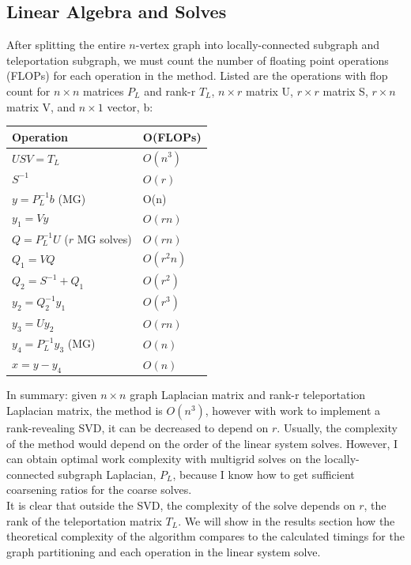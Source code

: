 \documentclass{article}
\begin{document}
\subsection{Linear Algebra and Solves}
After splitting the entire $n$-vertex graph into locally-connected subgraph and teleportation subgraph, we must count the number of floating point operations (FLOPs) for each operation in the method. Listed are the operations with flop count for $n\times n$ matrices $P_L$ and rank-r $T_L$, $n\times r$ matrix U, $r\times r$ matrix S, $r\times n$ matrix V, and $n\times 1$ vector, b:\\
\begin{spacing}{1}
\begin{center}
\renewcommand{\arraystretch}{1.5}
    \begin{tabular}{ | l | l |}
    \hline
    \textbf{Operation} & \textbf{O(FLOPs)} \\ \hline
    $USV = T_L$ & $O(n^3)$ \\ \hline
    $S^{-1}$ & $O(r)$ \\ \hline
    $y = P_L^{-1}b$ (MG) & O(n)  \\  \hline
    $y_1 = Vy$ & $O(rn)$ \\ \hline
    $Q = P_L^{-1}U$ ($r$ MG solves) & $O(rn)$ \\ \hline
    $Q_1 = VQ$ & $O(r^2 n)$ \\ \hline
    $Q_2 = S^{-1} + Q_1$ & $O(r^2)$ \\ \hline
    $y_2 = Q_2^{-1}y_1$ & $O(r^3)$ \\ \hline
    $y_3 = Uy_2$ & $O(rn)$ \\ \hline
    $y_4 = P_L^{-1}y_3$ (MG) & $O(n)$ \\ \hline
    $x = y - y_4$ & $O(n)$ \\
    \hline
    \end{tabular}
\end{center}
\end{spacing}
\vspace{.2in}
In summary: given $n\times n$ graph Laplacian matrix and rank-r teleportation Laplacian matrix, the method is $O(n^3)$, however with work to implement a rank-revealing SVD, it can be decreased to depend on $r$. Usually, the complexity of the method would depend on the order of the linear system solves. However, I can obtain optimal work complexity with multigrid solves on the locally-connected subgraph Laplacian, $P_L$, because I know how to get sufficient coarsening ratios for the coarse solves.\\
It is clear that outside the SVD, the complexity of the solve depends on $r$, the rank of the teleportation matrix $T_L$. We will show in the results section how the theoretical complexity of the algorithm compares to the calculated timings for the graph partitioning and each operation in the linear system solve.





%
%
\end{document}
